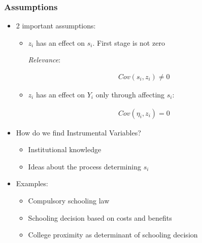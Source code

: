 \documentclass[pdftex]{beamer}
\begin{document}
\begin{frame}
\frametitle{Assumptions}
\begin{itemize}
\item 2 important assumptions:
   \begin {itemize}
    \item $z_{i}$ has an effect on $s_{i}$. First stage is not zero

     \emph{Relevance}:

     \begin{eqnarray*}
            Cov\left(s_{i}, z_{i}\right)\neq 0
      \end{eqnarray*}
    \item $z_{i}$ has an effect on $Y_{i}$ only through affecting $s_{i}$:

     \begin{eqnarray*}
           Cov\left(\eta_{i}, z_{i}\right)= 0
      \end{eqnarray*}

\end{itemize}
\item How do we find Instrumental Variables?
     \begin {itemize}
     \item Institutional knowledge
     \item Ideas about the process determining $s_{i}$
\end {itemize}
\item Examples:
      \begin {itemize}
         \item Compulsory schooling law
          \item Schooling decision based on costs and benefits
          \item College proximity as determinant of schooling decision
\end {itemize}
\end {itemize}
\end{frame}


\end{document}
